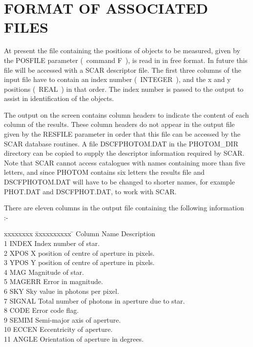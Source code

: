\appendix
\newpage
\section{FORMAT OF ASSOCIATED FILES}

At present the file containing the positions of objects
to be measured, given by the POSFILE parameter (~command F~), is read in in
free format. In future this file will be accessed with a SCAR descriptor
file. The first three columns of the input file have to contain an
index number (~INTEGER~), and the x and y positions (~REAL~) in that order.
The index number is passed to the output to assist in identification of the
objects.

The output on the screen contains column headers to indicate the content of
each column of the results. These column headers do not appear in the
output file given by the RESFILE parameter in order that this file can be
accessed by the SCAR database routines. A file DSCFPHOTOM.DAT in the
PHOTOM\_DIR directory can be copied to supply the descriptor information
required by SCAR. Note that SCAR cannot access catalogues with names
containing more than five letters, and since PHOTOM contains six letters
the results file and DSCFPHOTOM.DAT will have to be changed to shorter
names, for example PHOT.DAT and DSCFPHOT.DAT, to work with SCAR.

There are eleven columns in the output file containing the following
information :-

\begin{tabbing}
xxxxxxxx \= xxxxxxxxxx \= \kill
Column \> Name  \> Description \\
 1 \> INDEX \> Index number of star.\\
 2 \> XPOS \> X position of centre of aperture in pixels.\\
 3 \> YPOS \> Y position of centre of aperture in pixels.\\
 4 \> MAG \> Magnitude of star.\\
 5 \> MAGERR \> Error in magnitude.\\
 6 \> SKY \> Sky value in photons per pixel.\\
 7 \> SIGNAL \> Total number of photons in aperture due to star.\\
 8 \> CODE \> Error code flag.\\
 9 \> SEMIM \> Semi-major axis of aperture.\\
 10 \> ECCEN \> Eccentricity of aperture.\\
 11 \> ANGLE \> Orientation of aperture in degrees.\\
\end{tabbing}

